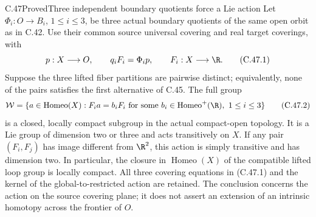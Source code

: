 \begin{claim}{C.47}{Proved}{Three independent boundary quotients force a Lie action}
Let $\Phi_i:O\to B_i$, $1\leq i\leq3$, be three actual boundary
quotients of the same open orbit as in C.42. Use their common source
universal covering and real target coverings, with
\[
 p:X\longrightarrow O,\qquad
 q_iF_i=\Phi_i p,\qquad F_i:X\longrightarrow\R .
                                                        \tag{C.47.1}
\]
Suppose the three lifted fiber partitions are pairwise distinct;
equivalently, none of the pairs satisfies the first alternative
of C.45. The full group
\[
 \mathcal W=
 \{a\in\operatorname{Homeo}(X):
       F_i a=b_iF_i\text{ for some }
       b_i\in\operatorname{Homeo}^+(\R),\ 1\leq i\leq3\}
                                                        \tag{C.47.2}
\]
is a closed, locally compact subgroup in the actual compact-open
topology. It is a Lie group of dimension two or three and acts
transitively on $X$. If any pair $(F_i,F_j)$ has image different
from $\R^2$, this action is simply transitive and has dimension two.
In particular, the closure in $\operatorname{Homeo}(X)$ of the
compatible lifted loop group is locally compact.
All three covering equations in (C.47.1) and the kernel of the
global-to-restricted action are retained. The conclusion concerns
the action on the source covering plane; it does not assert an
extension of an intrinsic homotopy across the frontier of $O$.
\end{claim}

